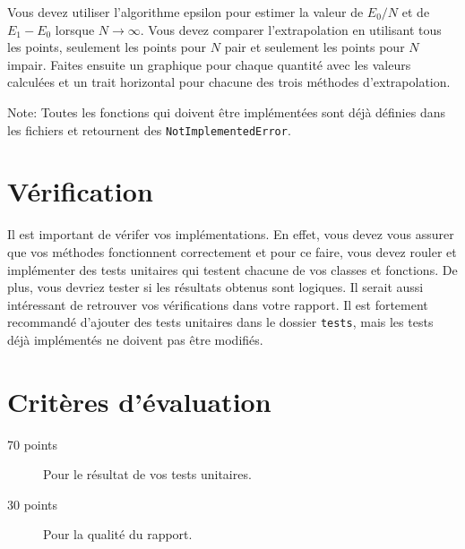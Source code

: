 \documentclass[12pt, letterpaper]{article}
\begin{document}
\noindent Vous devez utiliser l'algorithme epsilon
pour estimer la valeur de $E_0 / N$ et de $E_1 - E_0$ lorsque $N \to \infty$.
Vous devez comparer l'extrapolation en utilisant tous les points,
seulement les points pour $N$ pair et seulement les points pour $N$ impair.
Faites ensuite un graphique pour chaque quantité avec les valeurs calculées
et un trait horizontal pour chacune des trois méthodes d'extrapolation.

\bigskip

\noindent Note: Toutes les fonctions qui doivent être implémentées sont déjà définies dans les fichiers
et retournent des \texttt{NotImplementedError}.


\section{Vérification}\label{sec:verification}

\noindent Il est important de vérifer vos implémentations.
En effet, vous devez vous assurer que vos méthodes fonctionnent correctement et pour ce faire, vous devez rouler et
implémenter des tests unitaires qui testent chacune de vos classes et fonctions.
De plus, vous devriez tester si les résultats obtenus sont logiques.
Il serait aussi intéressant de retrouver vos vérifications dans votre rapport.
Il est fortement recommandé d'ajouter des tests unitaires dans le dossier \texttt{tests}, mais les tests déjà
implémentés ne doivent pas être modifiés.


\section{Critères d'évaluation}\label{sec:criteres-d'evaluation}

\begin{description}
  \item[70 points] Pour le résultat de vos tests unitaires.
  \item[30 points] Pour la qualité du rapport.
\end{description}
\end{document}
